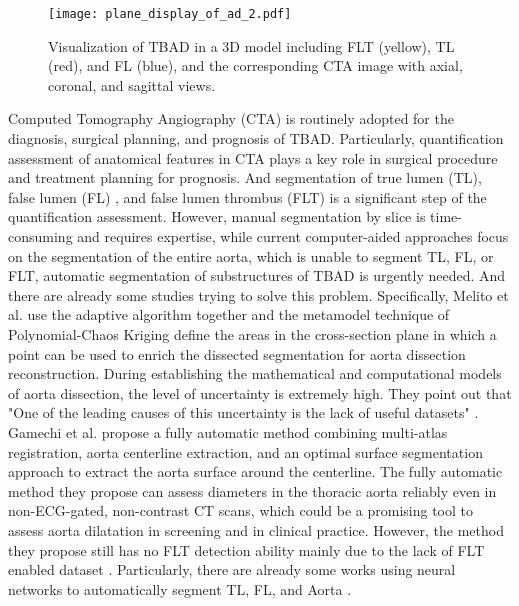 \documentclass{article}
\begin{document}
\begin{figure*}[!b]
\centering
\texttt{[image: plane\_display\_of\_ad\_2.pdf]}
\caption{Visualization of TBAD in a 3D model including FLT (yellow), TL (red), and FL (blue), and the corresponding CTA image with axial, coronal, and sagittal views.
}
\label{fig:display}
\end{figure*}


Computed Tomography Angiography (CTA) is routinely adopted for the diagnosis, surgical planning, and prognosis of TBAD.
Particularly, quantification assessment of anatomical features in CTA plays a key role in surgical procedure and treatment planning for prognosis.
And segmentation of true lumen (TL), false lumen (FL) , and false lumen thrombus (FLT) is a significant step of the quantification assessment.
%
%
%
However, manual segmentation by slice is time-consuming and requires expertise, while current computer-aided approaches focus on the segmentation of the entire aorta, which is unable to segment TL, FL, or FLT, automatic segmentation of substructures of TBAD is urgently needed.
%
%
And there are already some studies trying to solve this problem. 
%
Specifically, Melito et al. use the adaptive algorithm together and the metamodel technique of Polynomial-Chaos Kriging
define the areas in the cross-section plane in which a point can be used to enrich the dissected segmentation for aorta dissection reconstruction.
During establishing the mathematical and computational models of aorta dissection, the level of uncertainty is extremely high. They point out that "One of the leading causes of this uncertainty is the lack of useful datasets" \cite{melito2019reliability}.  
%
Gamechi et al. propose a fully automatic method combining multi-atlas registration, aorta centerline extraction, and an optimal surface segmentation approach to extract the aorta surface around the centerline.
The fully automatic method they propose can assess diameters in the thoracic aorta reliably even in non-ECG-gated, non-contrast CT scans, which could be a promising tool to assess aorta dilatation in screening and in clinical practice. 
However, the method they propose still has no FLT detection ability mainly due to the lack of FLT enabled dataset \cite{gamechi2019automated}.
Particularly, there are already some works using neural networks to automatically segment TL, FL, and Aorta \cite{li2018multi, cao2019fully}.
\end{document}
